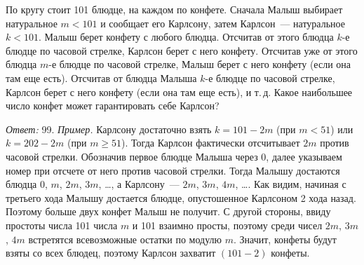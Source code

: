 По кругу стоит 101 блюдце, на каждом по конфете.
Сначала Малыш выбирает натуральное $m < 101$ и сообщает его Карлсону,
затем Карлсон~--- натуральное $k < 101$.
Малыш берет конфету с любого блюдца.
Отсчитав от этого блюдца $k$-е блюдце по часовой стрелке,
Карлсон берет с него конфету.
Отсчитав уже от этого блюдца $m$-е блюдце по часовой стрелке,
Малыш берет с него конфету (если она там еще есть).
Отсчитав от блюдца Малыша $k$-е блюдце по часовой стрелке,
Карлсон берет с него конфету (если она там еще есть), и т.\,д.
Какое наибольшее число конфет может гарантировать себе Карлсон?

\solution
\emph{Ответ:} 99.
\emph{Пример.}
Карлсону достаточно взять $k = 101 - 2 m$ (при $m < 51$) или $k = 202 - 2 m$
(при $m \geq 51$).
Тогда Карлсон фактически отсчитывает $2 m$ против часовой стрелки.
Обозначив первое блюдце Малыша через 0, далее указываем номер при отсчете от
него против часовой стрелки.
Тогда Малышу достаются блюдца $0$, $m$, $2 m$, $3 m$, \ldots,
а Карлсону~--- $2 m$, $3 m$, $4 m$, \ldots.
Как видим, начиная с третьего хода Малышу достается блюдце, опустошенное
Карлсоном 2 хода назад.
Поэтому больше двух конфет Малыш не получит.
С другой стороны, ввиду простоты числа 101 числа $m$ и 101 взаимно просты,
поэтому среди чисел $2 m$, $3 m$, $4 m$ встретятся всевозможные остатки по
модулю $m$.
Значит, конфеты будут взяты со всех блюдец, поэтому Карлсон захватит
$(101 - 2)$ конфеты.

